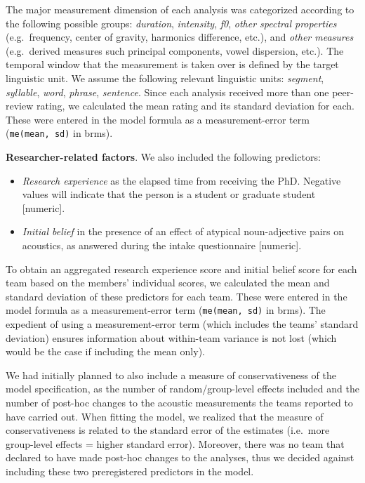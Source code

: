 \documentclass[Review,times,sageh]{sagej}
\providecommand{\tightlist}{\setlength{\itemsep}{0pt}\setlength{\parskip}{0pt}}
\begin{document}
The major measurement dimension of each analysis was categorized according to the following possible groups: \emph{duration}, \emph{intensity}, \emph{f0}, \emph{other spectral properties} (e.g.~frequency, center of gravity, harmonics difference, etc.), and \emph{other measures} (e.g.~derived measures such principal components, vowel dispersion, etc.).
The temporal window that the measurement is taken over is defined by the target linguistic unit.
We assume the following relevant linguistic units: \emph{segment}, \emph{syllable}, \emph{word}, \emph{phrase}, \emph{sentence}.
Since each analysis received more than one peer-review rating, we calculated the mean rating and its standard deviation for each.
These were entered in the model formula as a measurement-error term (\texttt{me(mean,\ sd)} in brms).

\textbf{Researcher-related factors}. We also included the following predictors:

\begin{itemize}
\tightlist
\item
  \emph{Research experience} as the elapsed time from receiving the PhD. Negative values will indicate that the person is a student or graduate student {[}numeric{]}.
\item
  \emph{Initial belief} in the presence of an effect of atypical noun-adjective pairs on acoustics, as answered during the intake questionnaire {[}numeric{]}.
\end{itemize}

To obtain an aggregated research experience score and initial belief score for each team based on the members' individual scores, we calculated the mean and standard deviation of these predictors for each team.
These were entered in the model formula as a measurement-error term (\texttt{me(mean,\ sd)} in brms).
The expedient of using a measurement-error term (which includes the teams' standard deviation) ensures information about within-team variance is not lost (which would be the case if including the mean only).

We had initially planned to also include a measure of conservativeness of the model specification, as the number of random/group-level effects included and the number of post-hoc changes to the acoustic measurements the teams reported to have carried out.
When fitting the model, we realized that the measure of conservativeness is related to the standard error of the estimates (i.e.~more group-level effects = higher standard error).
Moreover, there was no team that declared to have made post-hoc changes to the analyses, thus we decided against including these two preregistered predictors in the model.
\end{document}
